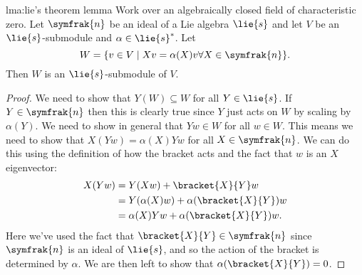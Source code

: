 \documentclass[fleqn]{NotesClass}
\newcommand{\nilpotentLie}{\symfrak{n}}
\begin{document}
    \begin{lma}{}{lma:lie's theorem lemma}
        Work over an algebraically closed field of characteristic zero.
        Let \(\nilpotentLie\) be an ideal of a Lie algebra \(\lie{s}\) and let \(V\) be an \(\lie{s}\)-submodule and \(\alpha \in \lie{s}^*\).
        Let
        \begin{equation}
            W = \{v \in V \mid Xv = \alpha(X)v \forall X \in \nilpotentLie\}.
        \end{equation}
        Then \(W\) is an \(\lie{s}\)-submodule of \(V\).
        \begin{proof}
            We need to show that \(Y(W) \subseteq W\) for all \(Y \in \lie{s}\).
            If \(Y \in \nilpotentLie\) then this is clearly true since \(Y\) just acts on \(W\) by scaling by \(\alpha(Y)\).
            We need to show in general that \(Yw \in W\) for all \(w \in W\).
            This means we need to show that \(X(Yw) = \alpha(X)Yw\) for all \(X \in \nilpotentLie\).
            We can do this using the definition of how the bracket acts and the fact that \(w\) is an \(X\) eigenvector:
            \begin{align}
                X(Yw) &= Y(Xw) + \bracket{X}{Y}w\\
                &= Y(\alpha(X)w) + \alpha(\bracket{X}{Y})w\\
                &= \alpha(X)Yw + \alpha(\bracket{X}{Y})w.\label{eqn:bracket eigenvector}
            \end{align}
            Here we've used the fact that \(\bracket{X}{Y} \in \nilpotentLie\) since \(\nilpotentLie\) is an ideal of \(\lie{s}\), and so the action of the bracket is determined by \(\alpha\).
            We are then left to show that \(\alpha(\bracket{X}{Y}) = 0\).
            

\end{proof}
\end{lma}
\end{document}
